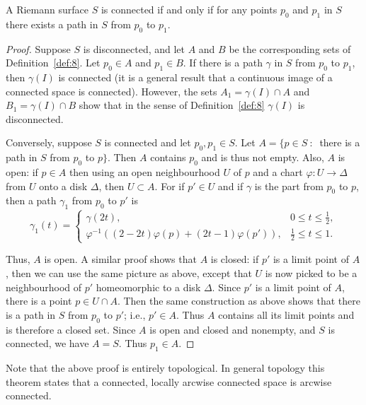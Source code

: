 \documentclass[a4paper,11pt]{article}
\begin{document}
\begin{propn}
  \label{propn:1}
  A Riemann surface $S$ is connected if and only if for any points
  $p_0$ and $p_1$ in $S$ there exists a path in $S$ from $p_0$ to
  $p_1$.
\end{propn}
\begin{proof}
  Suppose $S$ is disconnected, and let $A$ and $B$ be the
  corresponding sets of Definition~\ref{def:8}. Let $p_0 \in A$ and
  $p_1 \in B$.  If there is a path $\gamma$ in $S$ from $p_0$ to $p_1$,
  then $\gamma(I)$ is connected (it is a general result that a
  continuous image of a connected space is connected).  However, the
  sets $A_1 = \gamma(I) \cap A$ and $B_1 = \gamma(I) \cap B$ show that
  in the sense of Definition~\ref{def:8} $\gamma(I)$ is disconnected.

  Conversely, suppose $S$ is connected and let $p_0, p_1 \in S$.  Let
  $A = \{p \in S ~:~$ there is a path in $S$ from $p_0$ to $p\}$.
  Then $A$ contains $p_0$ and is thus not empty.  Also, $A$ is open:
  if $p \in A$ then using an open neighbourhood $U$ of $p$ and a chart
  $\varphi : U \to \Delta$ from $U$ onto a disk $\Delta$, then $U
  \subset A$.  For if $p' \in U$ and if $\gamma$ is the part from
  $p_0$ to $p$, then a path $\gamma_1$ from $p_0$ to $p'$ is
  $$
  \gamma_1(t) =
  \begin{cases}
    \gamma(2t), & 0 \le t \le \frac{1}{2},\\
    \varphi^{-1}((2-2t)\varphi(p) + (2t-1)\varphi(p')),
    & \frac{1}{2} \le t \le 1.
  \end{cases}
  $$

  \begin{mdframed}
    \vspace{4cm}
  \end{mdframed}

  Thus, $A$ is open.  A similar proof shows that $A$ is closed: if
  $p'$ is a limit point of $A$, then we can use the same picture as
  above, except that $U$ is now picked to be a neighbourhood of $p'$
  homeomorphic to a disk $\Delta$.  Since $p'$ is a limit point of
  $A$, there is a point $p \in U \cap A$.  Then the same construction
  as above  shows that there is a path in $S$ from $p_0$ to $p'$;
  i.e., $p' \in A$.  Thus $A$ contains all its limit points and is
  therefore a closed set.  Since $A$ is open and closed and nonempty,
  and $S$ is connected, we have $A = S$.  Thus $p_1 \in A$.
\end{proof}

\begin{rem}
  Note that the above proof is entirely topological.  In general
  topology this theorem states that a connected, locally arcwise
  connected space is arcwise connected.
\end{rem}
\end{document}
